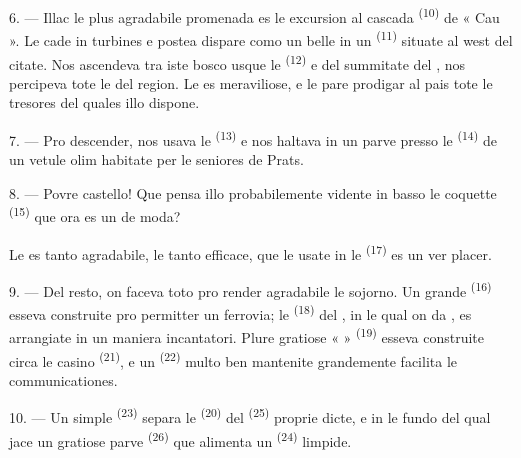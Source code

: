 \VUsaut{3.0mm}
\VUsaut{3.0mm}

6. --- Illac le plus agradabile promenada es le excursion al cascada
\textsuperscript{(10)} de « Cau ». Le  cade in turbines e
postea dispare como un belle  in un 
\textsuperscript{(11)} situate al west del citate. Nos ascendeva tra iste bosco
usque le  \textsuperscript{(12)} e del
summitate del , nos percipeva tote le  del
region. Le  es meraviliose, e le  pare prodigar
al pais tote le tresores del quales illo dispone.

7. --- Pro descender, nos usava le  \textsuperscript{(13)} e
nos haltava in un parve  presso le 
\textsuperscript{(14)} de un vetule  olim habitate per
le seniores de Prats.

8. --- Povre castello! Que pensa illo probabilemente vidente in basso le
coquette  \textsuperscript{(15)} que ora es un
 de moda?

Le  es tanto agradabile, le  tanto efficace,
que le  usate in le  \textsuperscript{(17)} es un
ver placer.

\VUsaut{3.0mm}
\VUsaut{3.0mm}

9. --- Del resto, on faceva toto pro render agradabile le sojorno. Un grande
 \textsuperscript{(16)} esseva construite pro permitter un
ferrovia; le  \textsuperscript{(18)} del , in le qual on da , es arrangiate in un maniera
incantatori. Plure gratiose «  » \textsuperscript{(19)} esseva
construite circa le casino \textsuperscript{(21)}, e un 
\textsuperscript{(22)} multo ben mantenite grandemente facilita le
communicationes.

10. --- Un simple  \textsuperscript{(23)} separa le 
\textsuperscript{(20)} del  \textsuperscript{(25)} proprie dicte, e
in le fundo del qual jace un gratiose parve 
\textsuperscript{(26)} que alimenta un  \textsuperscript{(24)}
limpide.

